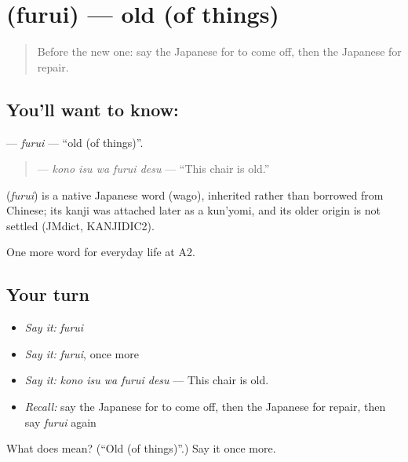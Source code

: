 \section[\texorpdfstring{\ja{ふるい} (furui)}{ふるい (furui)}]{ (furui) — old (of things)}

\label{lesson:JA-C162-furui}



\begin{quote}
Before the new one: say the Japanese for to come off, then the Japanese for repair.
\end{quote}

\subsection*{You'll want to know: }
\textbf{} — \emph{furui} — \textquotedblleft{}old (of things)\textquotedblright{}.

\begin{quote}
\textbf{  } — \emph{kono isu wa furui desu} — \textquotedblleft{}This chair is old.\textquotedblright{}
\end{quote}

\begin{cousinweb}
\textbf{} (\emph{furui}) is a native Japanese word (wago), inherited rather than borrowed from Chinese; its kanji was attached later as a kun'yomi, and its older origin is not settled (JMdict, KANJIDIC2).
\end{cousinweb}

\begin{grammarlens}[title={What you've built}]
One more word for everyday life at A2.
\end{grammarlens}

\subsection*{Your turn}
\begin{itemize}
\raggedright
  \item \emph{Say it:} \emph{furui}
  \item \emph{Say it:} \emph{furui}, once more
  \item \emph{Say it:} \emph{kono isu wa furui desu} — This chair is old.
  \item \emph{Recall:} say the Japanese for to come off, then the Japanese for repair, then say \emph{furui} again
\end{itemize}

\begin{tcolorbox}[breakable,colback=teal!4,colframe=teal!35!black,title={Before you move on}]
What does  mean? (\textquotedblleft{}Old (of things)\textquotedblright{}.) Say it once more.
\end{tcolorbox}
